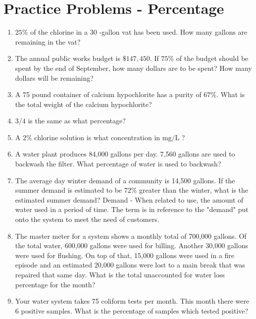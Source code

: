 \section*{Practice Problems - Percentage}
\begin{enumerate}
\item $25 \%$ of the chlorine in a 30 -gallon vat has been used. How many gallons are remaining in the vat?

\item The annual public works budget is $\$ 147,450$. If $75 \%$ of the budget should be spent by the end of September, how many dollars are to be spent? How many dollars will be remaining?

\item A 75 pound container of calcium hypochlorite has a purity of $67 \%$. What is the total weight of the calcium hypochlorite? 

\item $3 / 4$ is the same as what percentage?

\item A $2 \%$ chlorine solution is what concentration in $\mathrm{mg} / \mathrm{L}$ ?

\item A water plant produces 84,000 gallons per day. 7,560 gallons are used to backwash the filter. What percentage of water is used to backwash?

\item The average day winter demand of a community is 14,500 gallons. If the summer demand is estimated to be $72 \%$ greater than the winter, what is the estimated summer demand? Demand - When related to use, the amount of water used in a period of time. The term is in reference to the "demand" put onto the system to meet the need of customers.

\item The master meter for a system shows a monthly total of 700,000 gallons. Of the total water, 600,000 gallons were used for billing. Another 30,000 gallons were used for flushing. On top of that, 15,000 gallons were used in a fire episode and an estimated 20,000 gallons were lost to a main break that was repaired that same day. What is the total unaccounted for water loss percentage for the month?

\item Your water system takes 75 coliform tests per month. This month there were 6 positive samples. What is the percentage of samples which tested positive?
\end{enumerate}

